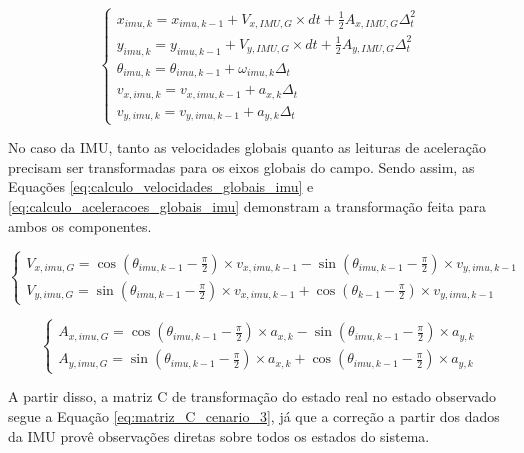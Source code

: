 \documentclass[acronym, symbols, table]{fei}
\begin{document}
			\begin{equation}\label{eq:correcao_cenario_3}
				\begin{cases}
					x_{imu,k} = x_{imu, k-1} + V_{x,IMU,G} \times dt + \frac{1}{2}A_{x,IMU,G} \Delta_t^2 \\
					y_{imu,k} = y_{imu, k-1} + V_{y,IMU,G} \times dt + \frac{1}{2}A_{y,IMU,G} \Delta_t^2 \\
					\theta_{imu,k} = \theta_{imu, k-1} + \omega_{imu,k} \Delta_t \\
					v_{x,imu,k} = v_{x,imu,k-1} + a_{x,k} \Delta_t\\
					v_{y,imu,k} = v_{y,imu,k-1} + a_{y,k} \Delta_t
				\end{cases}
			\end{equation}
		
			No caso da IMU, tanto as velocidades globais quanto as leituras de aceleração precisam ser transformadas para os eixos globais do campo. Sendo assim, as Equações \ref{eq:calculo_velocidades_globais_imu} e \ref{eq:calculo_aceleracoes_globais_imu} demonstram a transformação feita para ambos os componentes.
		
			\begin{equation}\label{eq:calculo_velocidades_globais_imu}
				\begin{cases}
					V_{x,imu,G} = \cos(\theta_{imu,k-1} - \frac{\pi}{2}) \times v_{x,imu,k-1} - \sin(\theta_{imu,k-1} - \frac{\pi}{2}) \times v_{y,imu,k-1} \\
					V_{y,imu,G} = \sin(\theta_{imu,k-1} - \frac{\pi}{2}) \times v_{x,imu,k-1} + \cos(\theta_{k-1} - \frac{\pi}{2}) \times v_{y,imu,k-1}
				\end{cases}
			\end{equation}
		
			\begin{equation}\label{eq:calculo_aceleracoes_globais_imu}
				\begin{cases}
					A_{x,imu,G} = \cos(\theta_{imu,k-1} - \frac{\pi}{2}) \times a_{x,k} - \sin(\theta_{imu,k-1} - \frac{\pi}{2}) \times a_{y,k} \\
					A_{y,imu,G} = \sin(\theta_{imu,k-1} - \frac{\pi}{2}) \times a_{x,k} + \cos(\theta_{imu,k-1} - \frac{\pi}{2}) \times a_{y,k}
				\end{cases}
			\end{equation}
		
			A partir disso, a matriz C de transformação do estado real no estado observado segue a Equação \ref{eq:matriz_C_cenario_3}, já que a correção a partir dos dados da IMU provê observações diretas sobre todos os estados do sistema.
			
\end{document}

